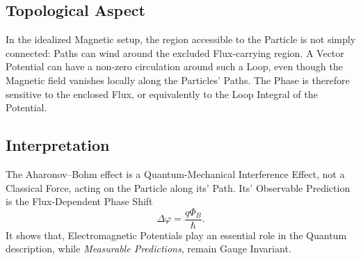\documentclass[a4paper, 10pt, onepage]{elegantbook}
\begin{document}
{\subsection{Topological Aspect}

In the idealized Magnetic setup, the region accessible to the Particle is not simply connected: Paths can wind around 
the excluded Flux-carrying region. A Vector Potential can have a non-zero circulation around such a Loop, even though 
the Magnetic field vanishes locally along the Particles' Paths. The Phase is therefore sensitive to the
enclosed Flux, or equivalently to the Loop Integral of the Potential.

\subsection{Interpretation}

The Aharonov--Bohm effect is a Quantum-Mechanical Interference Effect, not a Classical Force, acting on the Particle 
along its' Path. Its' Observable Prediction is the
Flux-Dependent Phase Shift
\[
\Delta\varphi=\frac{q\Phi_B}{\hbar}.
\]
It shows that, Electromagnetic Potentials play an essential role in the Quantum description, while \emph{Measurable 
Predictions}, remain Gauge Invariant.  




}
\end{document}
